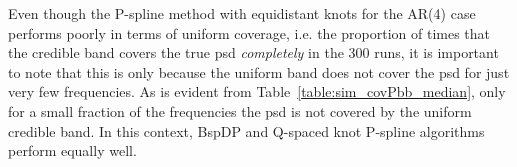 \documentclass[twocolumn,final]{svjour3}
\begin{document}
Even though the P-spline method with equidistant knots for the AR(4) case performs poorly in terms of uniform coverage, i.e. the proportion of times that the credible band covers  the true psd {\em completely} in the 300 runs, it is important to note that this is only because the uniform band does not cover
the psd for  just very few frequencies. As is evident from 
Table~\ref{table:sim_covPbb_median},  only for a small fraction of the frequencies the psd is not covered by the uniform credible band.  In this context, BspDP and Q-spaced  knot P-spline algorithms perform equally well.  

\end{document}
